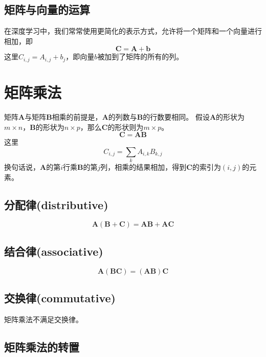\subsection{矩阵与向量的运算}

在深度学习中，我们常常使用更简化的表示方式，允许将一个矩阵和一个向量进行相加，即
\begin{equation}
  \bm{C = A + b}
\end{equation}
这里$C_{i,j} = A_{i,j} + b_j$，即向量$b$被加到了矩阵的所有的列。

\section{矩阵乘法}

矩阵$\bm{A}$与矩阵$\bm{B}$相乘的前提是，$\bm{A}$的列数与$\bm{B}$的行数要相同。
假设$\bm{A}$的形状为$m\times n$，$\bm{B}$的形状为$n\times p$，那么$\bm{C}$的形状则为$m\times p$。
\begin{equation}
  \bm{C} = \bm{AB}
\end{equation}
这里
\begin{equation}
  C_{i,j} = \sum_k A_{i,k}B_{k,j}
\end{equation}
换句话说，$\bm{A}$的第$i$行乘$\bm{B}$的第$j$列，相乘的结果相加，得到$\bm{C}$的索引为$(i,j)$的元素。


\subsection{分配律(distributive)}

\begin{equation}
  \bm{A(B+C) = AB + AC}
\end{equation}

\subsection{结合律(associative)}

\begin{equation}
  \bm{A(BC) = (AB)C}
\end{equation}

\subsection{交换律(commutative)}

矩阵乘法不满足交换律。


\subsection{矩阵乘法的转置}

